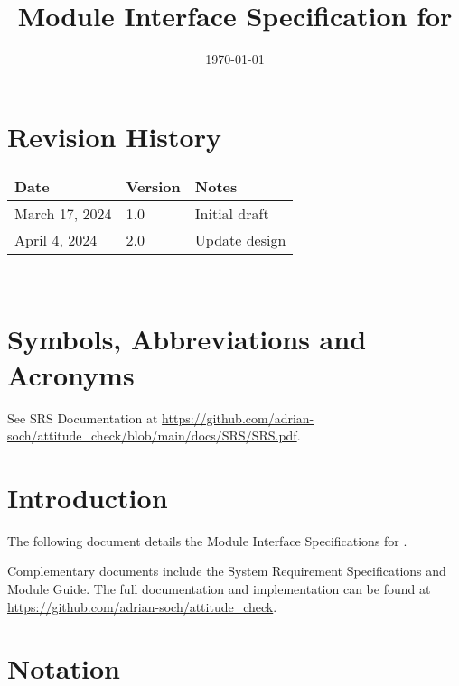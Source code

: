 \documentclass[12pt, titlepage]{article}
\begin{document}
\title{Module Interface Specification for \progname{}}

\author{\authname}

\date{\today}

\maketitle


\section{Revision History}

\begin{tabularx}{\textwidth}{p{3cm}p{2cm}X} \toprule {\bf Date} & {\bf Version} & {\bf Notes}\\
\midrule
March 17, 2024 & 1.0 & Initial draft\\
April 4, 2024 & 2.0 & Update design\\
\bottomrule
\end{tabularx}

~\newpage

\section{Symbols, Abbreviations and Acronyms}

See SRS Documentation at
\url{https://github.com/adrian-soch/attitude_check/blob/main/docs/SRS/SRS.pdf}.


\newpage

\tableofcontents

\newpage


\section{Introduction}

The following document details the Module Interface Specifications for \progname.

Complementary documents include the System Requirement Specifications and Module Guide.  The full
documentation and implementation can be found at
\url{https://github.com/adrian-soch/attitude_check}.  

\section{Notation}
\end{document}
